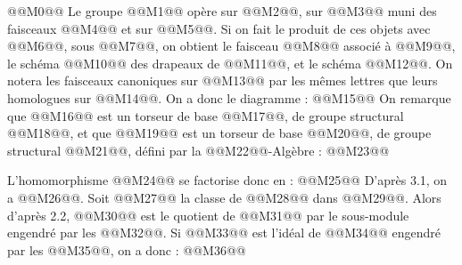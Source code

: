 
@@M0@@
Le
groupe @@M1@@ opère sur @@M2@@, sur @@M3@@ muni des faisceaux @@M4@@ et sur @@M5@@. Si on fait le produit de ces objets avec @@M6@@, sous @@M7@@, on obtient le faisceau @@M8@@ associé à @@M9@@, le schéma @@M10@@ des drapeaux de @@M11@@, et le schéma @@M12@@. On notera les faisceaux canoniques sur @@M13@@ par les mêmes lettres que leurs homologues sur @@M14@@. On a donc le diagramme :
@@M15@@
On remarque que @@M16@@ est un torseur de base @@M17@@, de groupe structural @@M18@@, et que @@M19@@ est un torseur de base @@M20@@, de groupe structural @@M21@@, défini par la @@M22@@-Algèbre :
@@M23@@

L'homomorphisme @@M24@@ se factorise donc en :
@@M25@@
D'après 3.1, on a @@M26@@. Soit @@M27@@ la classe de @@M28@@ dans @@M29@@. Alors d'après 2.2, @@M30@@ est le quotient de @@M31@@ par le sous-module engendré par les @@M32@@. Si @@M33@@ est l'idéal de @@M34@@ engendré par les @@M35@@, on a donc :
@@M36@@
